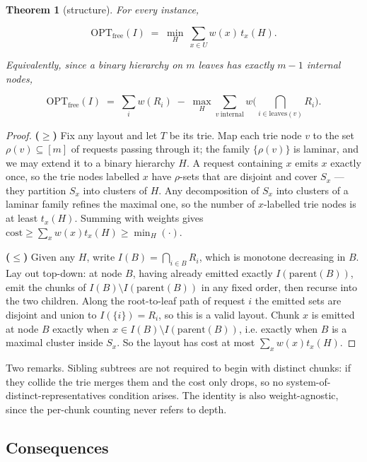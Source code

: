 \documentclass[11pt]{article}
\theoremstyle{plain}
\newtheorem{theorem}{Theorem}
\begin{document}
\begin{theorem}[structure]
For every instance,

\begin{equation}
\mathrm{OPT}_{\mathrm{free}}(I) \;=\; \min_{H}\ \sum_{x \in U} w(x)\, t_x(H).
\end{equation}

Equivalently, since a binary hierarchy on $m$ leaves has exactly $m-1$ internal nodes,

\begin{equation}
\mathrm{OPT}_{\mathrm{free}}(I) \;=\; \sum_i w(R_i) \;-\; \max_{H} \sum_{v\ \mathrm{internal}} w\Big(\bigcap_{i \in \mathrm{leaves}(v)} R_i\Big).
\end{equation}
\end{theorem}
\begin{proof}
\textbf{($\ge$)} Fix any layout and let $T$ be its trie. Map each trie node $v$ to the set $\rho(v) \subseteq [m]$ of requests passing through it; the family $\{\rho(v)\}$ is laminar, and we may extend it to a binary hierarchy $H$. A request containing $x$ emits $x$ exactly once, so the trie nodes labelled $x$ have $\rho$-sets that are disjoint and cover $S_x$ --- they partition $S_x$ into clusters of $H$. Any decomposition of $S_x$ into clusters of a laminar family refines the maximal one, so the number of $x$-labelled trie nodes is at least $t_x(H)$. Summing with weights gives $\mathrm{cost} \ge \sum_x w(x) t_x(H) \ge \min_H(\cdot)$.

\textbf{($\le$)} Given any $H$, write $I(B) = \bigcap_{i\in B}R_i$, which is monotone decreasing in $B$. Lay out top-down: at node $B$, having already emitted exactly $I(\mathrm{parent}(B))$, emit the chunks of $I(B)\setminus I(\mathrm{parent}(B))$ in any fixed order, then recurse into the two children. Along the root-to-leaf path of request $i$ the emitted sets are disjoint and union to $I(\{i\}) = R_i$, so this is a valid layout. Chunk $x$ is emitted at node $B$ exactly when $x \in I(B) \setminus I(\mathrm{parent}(B))$, i.e. exactly when $B$ is a maximal cluster inside $S_x$. So the layout has cost at most $\sum_x w(x)t_x(H)$. 
\end{proof}

Two remarks. Sibling subtrees are not required to begin with distinct chunks: if they collide the trie merges them and the cost only drops, so no system-of-distinct-representatives condition arises. The identity is also weight-agnostic, since the per-chunk counting never refers to depth.

\subsection{Consequences}
\end{document}
